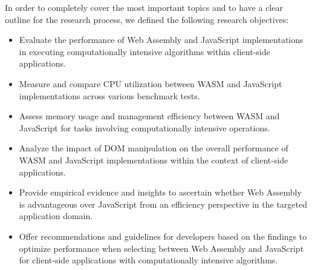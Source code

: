 In order to completely cover the most important topics and to have a clear outline for the research process, we defined the following research objectives:

\begin{itemize}
    \item Evaluate the performance of Web Assembly and JavaScript implementations in executing computationally intensive algorithms within client-side applications.
    \item Measure and compare CPU utilization between WASM and JavaScript implementations across various benchmark tests.
    \item Assess memory usage and management efficiency between WASM and JavaScript for tasks involving computationally intensive operations.
    \item Analyze the impact of DOM manipulation on the overall performance of WASM and JavaScript implementations within the context of client-side applications.
    \item Provide empirical evidence and insights to ascertain whether Web Assembly is advantageous over JavaScript from an efficiency perspective in the targeted application domain.
    \item Offer recommendations and guidelines for developers based on the findings to optimize performance when selecting between Web Assembly and JavaScript for client-side applications with computationally intensive algorithms.
\end{itemize}